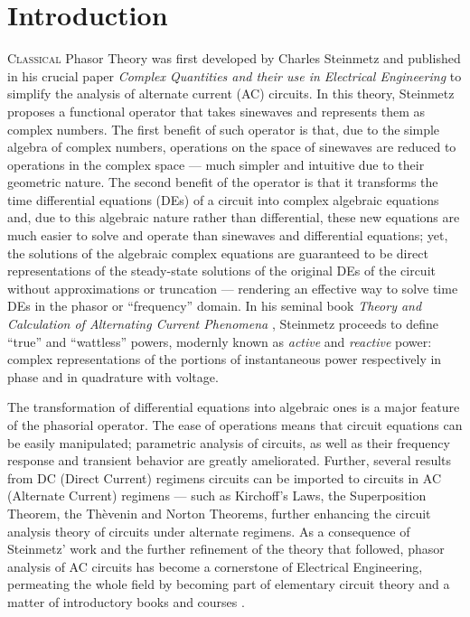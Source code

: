 \chapter{Introduction}\label{chapter:intro}

	\lettrine{C}{lassical} Phasor Theory was first developed by Charles Steinmetz and published in his crucial paper \textit{Complex Quantities and their use in Electrical Engineering}  to simplify the analysis of alternate current (AC) circuits. In this theory, Steinmetz proposes a functional operator that takes sinewaves and represents them as complex numbers. The first benefit of such operator is that, due to the simple algebra of complex numbers, operations on the space of sinewaves are reduced to operations in the complex space — much simpler and intuitive due to their geometric nature. The second benefit of the operator is that it transforms the time differential equations (DEs) of a circuit into complex algebraic equations and, due to this algebraic nature rather than differential, these new equations are much easier to solve and operate than sinewaves and differential equations; yet, the solutions of the algebraic complex equations are guaranteed to be direct representations of the steady-state solutions of the original DEs of the circuit without approximations or truncation — rendering an effective way to solve time DEs in the phasor or ``frequency'' domain. In his seminal book \textit{Theory and Calculation of Alternating Current Phenomena} , Steinmetz proceeds to define ``true'' and ``wattless'' powers, modernly known as \textit{active} and \textit{reactive} power: complex representations of the portions of instantaneous power respectively in phase and in quadrature with voltage.

	The transformation of differential equations into algebraic ones is a major feature of the phasorial operator. The ease of operations means that circuit equations can be easily manipulated; parametric analysis of circuits, as well as their frequency response and transient behavior are greatly ameliorated. Further, several results from DC (Direct Current) regimens circuits can be imported to circuits in AC (Alternate Current) regimens — such as Kirchoff's Laws, the Superposition Theorem, the Thèvenin and Norton Theorems, further enhancing the circuit analysis theory of circuits under alternate regimens. As a consequence of Steinmetz' work and the further refinement of the theory that followed, phasor analysis of AC circuits has become a cornerstone of Electrical Engineering, permeating the whole field by becoming part of elementary circuit theory and a matter of introductory books and courses .

